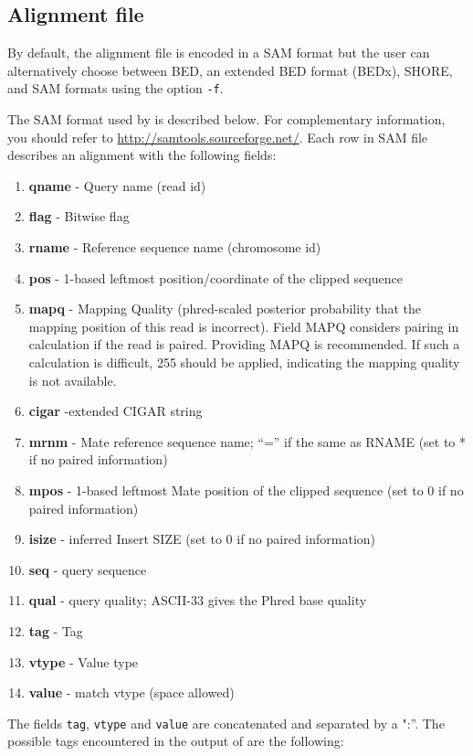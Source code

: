 \documentclass{article}
\begin{document}
\subsection{Alignment file}
\label{sec:samfile}
By default, the alignment file is encoded in a SAM format but the user
can alternatively choose between BED, an extended BED format (BEDx),
SHORE, and SAM formats using the option \texttt{-f}.

The SAM format used by \PALMapper{} is described below. For
complementary information, you should refer to
\url{http://samtools.sourceforge.net/}. Each row in SAM file describes
an alignment with the following fields:
\begin{enumerate}
\item \textbf{qname} - Query name (read id)
\item \textbf{flag} - Bitwise flag
\item \textbf{rname} - Reference sequence name (chromosome id) 
\item \textbf{pos} - 1-based leftmost position/coordinate of the
  clipped sequence 
\item \textbf{mapq} - Mapping Quality (phred-scaled posterior probability that the mapping
position of this read is incorrect). Field MAPQ considers pairing in
calculation if the read is paired. Providing MAPQ is recommended. If
such a calculation is difficult, 255 should be applied, indicating the
mapping quality is not available.
\item \textbf{cigar} -extended CIGAR string 
\item \textbf{mrnm} - Mate reference sequence name; “=” if the same as
  RNAME (set to * if no paired information)
\item \textbf{mpos} - 1-based leftmost Mate position of the clipped
  sequence (set to 0 if no paired information)
\item \textbf{isize} - inferred Insert SIZE (set to 0 if no paired information)
\item \textbf{seq} - query sequence
\item \textbf{qual} - query quality; ASCII-33 gives the Phred base quality
\item \textbf{tag} - Tag
\item \textbf{vtype} - Value type
\item \textbf{value} - match vtype (space allowed) 
\end{enumerate}

The fields \texttt{tag}, \texttt{vtype} and \texttt{value} are
concatenated and separated by a ":''. The possible tags
encountered in the output of \PALMapper{} are the following:\\
\end{document}
